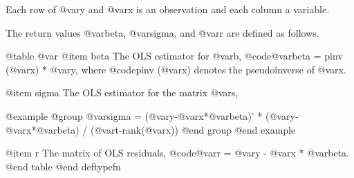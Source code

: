 Each row of @var{y} and @var{x} is an observation and each column a
variable.

The return values @var{beta}, @var{sigma}, and @var{r} are defined as
follows.

@table @var
@item beta
The OLS estimator for @var{b}, @code{@var{beta} = pinv (@var{x}) *
@var{y}}, where @code{pinv (@var{x})} denotes the pseudoinverse of
@var{x}.

@item sigma
The OLS estimator for the matrix @var{s},

@example
@group
@var{sigma} = (@var{y}-@var{x}*@var{beta})' * (@var{y}-@var{x}*@var{beta}) / (@var{t}-rank(@var{x}))
@end group
@end example

@item r
The matrix of OLS residuals, @code{@var{r} = @var{y} - @var{x} * @var{beta}}.
@end table
@end deftypefn

